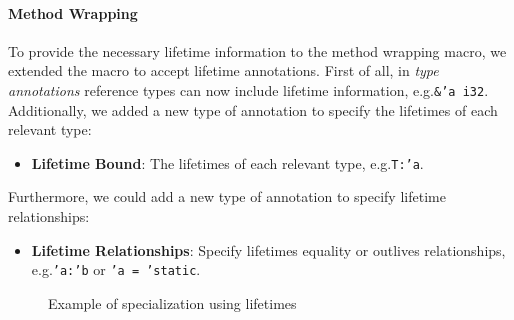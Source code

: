 \paragraph{Method Wrapping}
To provide the necessary lifetime information to the method wrapping macro, we extended the  macro to accept lifetime annotations.
First of all, in \textit{type annotations} reference types can now include lifetime information, e.g.\@ \mbox{\texttt{\&'a i32}}.
Additionally, we added a new type of annotation to specify the lifetimes of each relevant type:
\begin{itemize}
	\item \textbf{Lifetime Bound}: The lifetimes of each relevant type, e.g.\@ \mbox{\texttt{T:\@ 'a}}.
\end{itemize}
Furthermore, we could add a new type of annotation to specify lifetime relationships:
\begin{itemize}
	\item \textbf{Lifetime Relationships}: Specify lifetimes equality or outlives relationships, e.g.\@ \mbox{\texttt{'a:\@ 'b}} or \mbox{\texttt{'a = 'static}}.
\end{itemize}

\begin{figure}[htbp!]
	\centering
	\captionsetup{type=listing,skip=2pt}
	\caption{Example of specialization using lifetimes}
	\label{fig:lifetimes-specialization-pre}
\end{figure}


